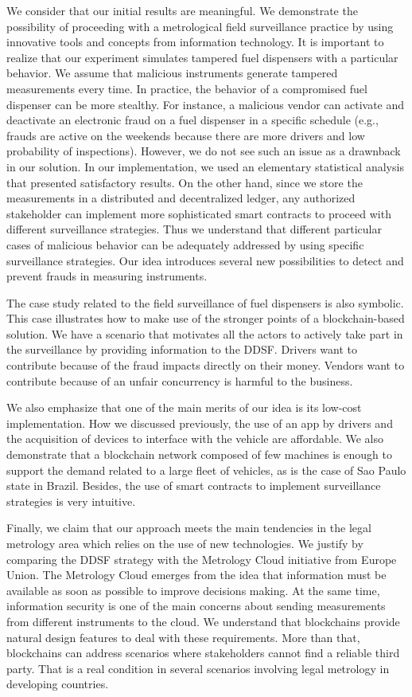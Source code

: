 \documentclass[sigplan]{acmart}
\begin{document}
We consider that our initial results are meaningful.
We demonstrate the possibility of proceeding with a metrological field surveillance practice by using innovative tools and concepts from information technology.
It is important to realize that our experiment simulates tampered fuel dispensers with a particular behavior.
We assume that malicious instruments generate tampered measurements every time.
In practice, the behavior of a compromised fuel dispenser can be more stealthy.
For instance, a malicious vendor can activate and deactivate an electronic fraud on a fuel dispenser in a specific schedule (e.g., frauds are active on the weekends because there are more drivers and low probability of inspections).
However, we do not see such an issue as a drawnback in our solution.
In our implementation, we used an elementary statistical analysis that presented satisfactory results.
On the other hand, since we store the measurements in a distributed and decentralized ledger, any authorized stakeholder can implement more sophisticated smart contracts to proceed with different surveillance strategies.
Thus we understand that different particular cases of malicious behavior can be adequately addressed by using specific surveillance strategies.
Our idea introduces several new possibilities to detect and prevent frauds in measuring instruments.

The case study related to the field surveillance of fuel dispensers is also symbolic.
This case illustrates how to make use of the stronger points of a blockchain-based solution.
We have a scenario that motivates all the actors to actively take part in the surveillance by providing information to the DDSF.
Drivers want to contribute because of the fraud impacts directly on their money.
Vendors want to contribute because of an unfair concurrency is harmful to the business.

We also emphasize that one of the main merits of our idea is its low-cost implementation.
How we discussed previously, the use of an app by drivers and the acquisition of devices to interface with the vehicle are affordable.
We also demonstrate that a blockchain network composed of few machines is enough to support the demand related to a large fleet of vehicles, as is the case of Sao Paulo state in Brazil.
Besides, the use of smart contracts to implement surveillance strategies is very intuitive.

Finally, we claim that our approach meets the main tendencies in the legal metrology area which relies on the use of new technologies.
We justify by comparing the DDSF strategy with the Metrology Cloud initiative from Europe Union.
The Metrology Cloud emerges from the idea that information must be available as soon as possible to improve decisions making.
At the same time, information security is one of the main concerns about sending measurements from different instruments to the cloud.
We understand that blockchains provide natural design features to deal with these requirements.
More than that, blockchains can address scenarios where stakeholders cannot find a reliable third party.
That is a real condition in several scenarios involving legal metrology in developing countries.
\end{document}
